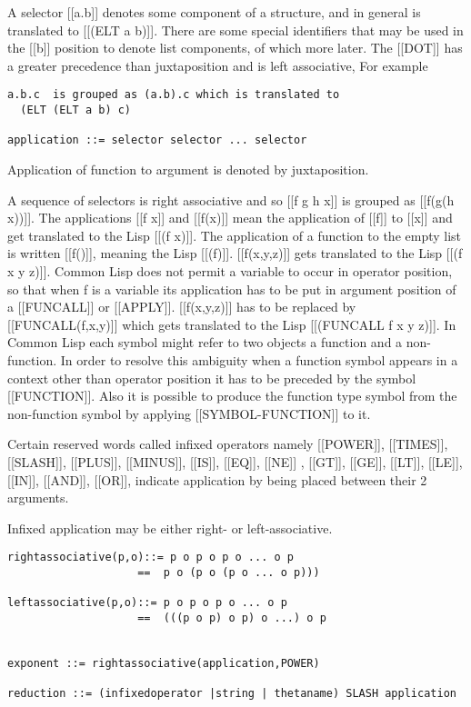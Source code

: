 \documentclass{article}
\begin{document}
A selector [[a.b]] denotes some component of a structure, and in
general is translated to [[(ELT a b)]]. There are some special identifiers
that may be used in the [[b]] position to denote list components, of which
more later.
The [[DOT]] has a greater precedence than juxtaposition and is
left associative, For example
\begin{verbatim}
a.b.c  is grouped as (a.b).c which is translated to
  (ELT (ELT a b) c)

application ::= selector selector ... selector

\end{verbatim}

Application of function to argument is denoted by juxtaposition.

A sequence of selectors is right associative and so
[[f g h x]] is grouped as [[f(g(h x))]]. The applications [[f x]] and
[[f(x)]]
mean the application of [[f]] to [[x]] and get translated to
the Lisp [[(f x)]]. The application of a function to the empty list
is written [[f()]], meaning the Lisp [[(f)]].  [[f(x,y,z)]] gets translated to
the Lisp [[(f x y z)]].
Common Lisp does not permit a variable to occur in operator position,
so that when f is a variable its application has to be
put in argument position of a [[FUNCALL]] or [[APPLY]].
[[f(x,y,z)]] has to be replaced by [[FUNCALL(f,x,y)]] which gets translated to
the Lisp [[(FUNCALL f x y z)]].
In Common Lisp each symbol might refer
to two objects a function and a non-function. In order to resolve
this ambiguity when a function symbol appears in a context other
than operator position it has to be preceded by the symbol [[FUNCTION]].
Also it is possible to produce the function type symbol from the
non-function symbol by applying [[SYMBOL-FUNCTION]] to it.

Certain reserved words called infixed operators namely
[[POWER]], [[TIMES]], [[SLASH]], [[PLUS]], [[MINUS]], [[IS]],
[[EQ]], [[NE]] , [[GT]], [[GE]], [[LT]], [[LE]], [[IN]], [[AND]],
[[OR]], indicate application by being placed between their 2 arguments.

Infixed application may be either right- or left-associative.
\begin{verbatim}
rightassociative(p,o)::= p o p o p o ... o p
                    ==  p o (p o (p o ... o p)))

leftassociative(p,o)::= p o p o p o ... o p
                    ==  (((p o p) o p) o ...) o p


exponent ::= rightassociative(application,POWER)

reduction ::= (infixedoperator |string | thetaname) SLASH application
\end{verbatim}
\end{document}
